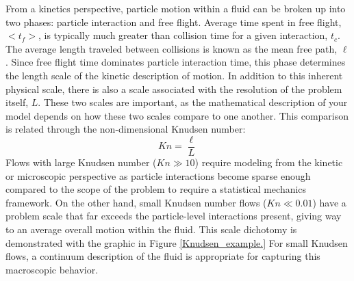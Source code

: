 From a kinetics perspective, particle motion within a fluid can be broken up into two phases: particle interaction and free flight. Average time spent in free flight, $<t_f>$, is typically much greater than collision time for a given interaction, $t_c$. The average length traveled between collisions is known as the mean free path, $\ell$.  Since free flight time dominates particle interaction time, this phase determines the length scale of the kinetic description of motion. In addition to this inherent physical scale, there is also a scale associated with the resolution of the problem itself, $L$. These two scales are important, as the mathematical description of your model depends on how these two scales compare to one another. This comparison is related through the non-dimensional Knudsen number: 
\begin{equation}\label{Knudsen}
Kn = \dfrac{\ell}{L}
\end{equation} 
Flows with large Knudsen number ($Kn \gg 10$) require modeling from the kinetic or microscopic perspective as particle interactions become sparse enough compared to the scope of the problem to require a statistical mechanics framework. On the other hand, small Knudsen number flows ($Kn \ll 0.01$) have a problem scale that far exceeds the particle-level interactions present, giving way to an average overall motion within the fluid. This scale dichotomy is demonstrated with the graphic in Figure \ref{Knudsen_example.} For small Knudsen flows, a continuum description of the fluid is appropriate for capturing this macroscopic behavior. 

